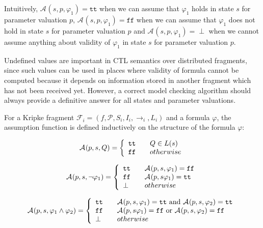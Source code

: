 \documentclass[12pt,oneside,draft]{fithesis2}
\newcommand{\as}[1][]{\ensuremath{\mathcal{A}_{#1}}}
\newcommand{\true}{\ensuremath{\texttt{tt}}}
\newcommand{\false}{\ensuremath{\texttt{ff}}}
\newcommand{\kf}[2]{\ensuremath{\mathcal{F}^{#2}_{#1}}}
\newcommand{\fullKf}[2]{\ensuremath{ \kf{#1}{#2} = (f, \params, S_{#1}, I_{i}, \trans{}_{#1}, L_{#1}) }}
\newcommand{\trans}[1]{\stackrel{#1}{\rightarrow}}
\newcommand{\params}{\mathcal{P}}
\begin{document}
			Intuitively, $\as(s, p, \varphi_1) = \true$ when we can assume that $\varphi_1$ holds in state $s$ for parameter valuation $p$, $\as(s, p, \varphi_1) = \false$ when we can assume that $\varphi_1$ does not hold in state $s$ for parameter valuation $p$ and $\as(s, p, \varphi_1) = \perp$ when we cannot assume anything about validity of $\varphi_1$ in state $s$ for parameter valuation $p$.
			
			Undefined values are important in CTL semantics over distributed fragments, since such values can be used in places where validity of formula cannot be computed because it depends on information stored in another fragment which has not been received yet. However, a correct model checking algorithm should always provide a definitive answer for all states and parameter valuations.
			
			For a Kripke fragment $\fullKf{i}{}$ and a formula $\varphi$, the assumption function is defined inductively on the structure of the formula $\varphi$:
			
			\begin{center}								
				\[\as(p, s, Q) = \left\{ 
  					\begin{array}{l l}
					    \true & \quad Q \in L(s)\\
					   	\false & \quad otherwise\\
				  \end{array} 
				\right.\]
			\end{center}
			
			\begin{center}								
				\[\as(p, s, \neg \varphi_1) = \left\{ 
  					\begin{array}{l l}
					    \true & \quad \as(p, s, \varphi_1) = \false\\
					   	\false & \quad \as(p, s \varphi_1) = \true\\
					   	\perp & \quad otherwise\\
				  \end{array} 
				\right.\]
			\end{center}
			
			\begin{center}								
				\[\as(p, s, \varphi_1 \wedge \varphi_2) = \left\{ 
  					\begin{array}{l l}
					    \true & \quad \as(p, s, \varphi_1) = \true $ and $ \as(p, s, \varphi_2) = \true\\
					   	\false & \quad \as(p, s \varphi_1) = \false $ or $ \as(p, s, \varphi_2) = \false\\
					   	\perp & \quad otherwise\\
				  \end{array} 
				\right.\]
			\end{center}			
			
\end{document}
